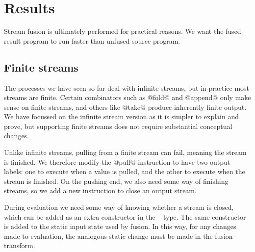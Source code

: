 
\section{Results}
\label{s:Evaluation}

Stream fusion is ultimately performed for practical reasons. We want the fused result program to run faster than unfused source program.

\subsection{Finite streams}
\label{s:Finite}

The processes we have seen so far deal with infinite streams, but in practice most streams are finite. Certain combinators such as @fold@ and @append@ only make sense on finite streams, and others like @take@ produce inherently finite output. We have focussed on the infinite stream version as it is simpler to explain and prove, but supporting finite streams does not require substantial conceptual changes.

Unlike infinite streams, pulling from a finite stream can fail, meaning the stream is finished. We therefore modify the @pull@ instruction to have two output labels: one to execute when a value is pulled, and the other to execute when the stream is finished. On the pushing end, we also need some way of finishing streams, so we add a new instruction to close an output stream.

During evaluation we need some way of knowing whether a stream is closed, which can be added as an extra constructor in the \InputState~ type. The same constructor is added to the static input state used by fusion. In this way, for any changes made to evaluation, the analogous static change must be made in the fusion transform.


